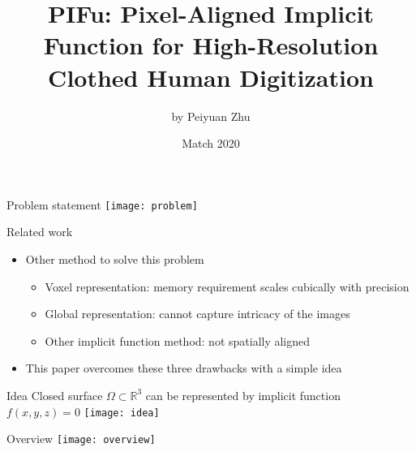 \documentclass{beamer}
\title{PIFu: Pixel-Aligned Implicit Function for High-Resolution Clothed Human Digitization}
\author{by Peiyuan Zhu}
\date{Match 2020}
\begin{document}
	\maketitle
	
	\begin{frame}{Problem statement}
		\texttt{[image: problem]}
	\end{frame}
	
	\begin{frame}{Related work}
		\begin{itemize}
			\item Other method to solve this problem
			\begin{itemize}
				\item Voxel representation: memory requirement scales cubically with precision
				\item Global representation: cannot capture intricacy of the images
				\item Other implicit function method: not spatially aligned
			\end{itemize}
			\item This paper overcomes these three drawbacks with a simple idea
		\end{itemize}
	\end{frame}

	\begin{frame}{Idea}
		Closed surface $\Omega\subset\mathbb{R}^3$ can be represented by implicit function $f(x,y,z)=0$
		\texttt{[image: idea]}
	\end{frame}

	\begin{frame}{Overview}
		\texttt{[image: overview]}
	\end{frame}
	
\end{document}
